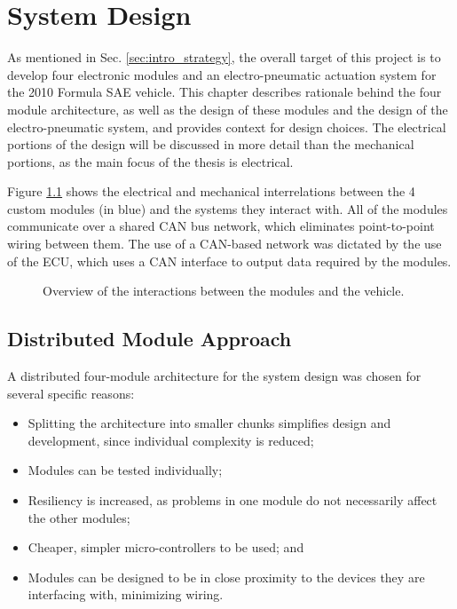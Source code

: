 \chapter{System Design\label{cha:design}}

As mentioned in Sec. \ref{sec:intro_strategy}, the overall target of this project is to develop four electronic modules and an electro-pneumatic actuation system for the 2010 Formula SAE vehicle. This chapter describes rationale behind the four module architecture, as well as the design of these modules and the design of the electro-pneumatic system, and provides context for design choices. The electrical portions of the design will be discussed in more detail than the mechanical portions, as the main focus of the thesis is electrical. 

Figure \ref{fig:design_overview} shows the electrical and mechanical interrelations between the 4 custom modules (in blue) and the systems they interact with. All of the modules communicate over a shared CAN bus network, which eliminates point-to-point wiring between them. The use of a CAN-based network was dictated by the use of the ECU, which uses a CAN interface to output data required by the modules. 

\begin{figure}[H]
\centering

\caption{Overview of the interactions between the modules and the vehicle.}
\label{fig:design_overview}
\end{figure}

\section{Distributed Module Approach}

A distributed four-module architecture for the system design was chosen for several specific reasons:

\begin{itemize}
  \item Splitting the architecture into smaller chunks simplifies design and development, since individual complexity is reduced;
  \item Modules can be tested individually;
  \item Resiliency is increased, as problems in one module do not necessarily affect the other modules;
  \item Cheaper, simpler micro-controllers to be used; and
  \item Modules can be designed to be in close proximity to the devices they are interfacing with, minimizing wiring.
\end{itemize}





